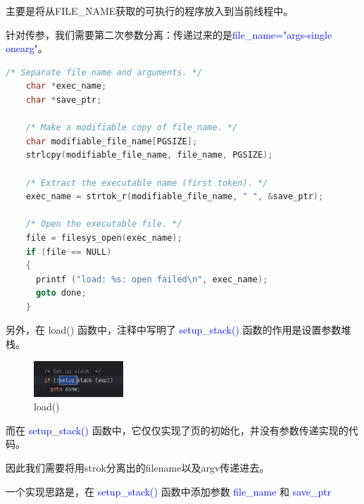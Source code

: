 \documentclass[14pt,a4paper,UTF8,twoside]{article}
\renewcommand{\texttt}[1]{\textcolor{blue}{\ttfamily #1}}
\begin{document}
主要是将从FILE\_NAME获取的可执行的程序放入到当前线程中。

针对传参，我们需要第二次参数分离：传递过来的是\texttt{file\_name="args-single onearg"}。

\begin{lstlisting}[language=C, title= load]
    /* Separate file name and arguments. */
    char *exec_name;
    char *save_ptr;
  
    /* Make a modifiable copy of file_name. */
    char modifiable_file_name[PGSIZE];
    strlcpy(modifiable_file_name, file_name, PGSIZE);
  
    /* Extract the executable name (first token). */
    exec_name = strtok_r(modifiable_file_name, " ", &save_ptr);
  
    /* Open the executable file. */
    file = filesys_open(exec_name);
    if (file == NULL) 
    {
      printf ("load: %s: open failed\n", exec_name);
      goto done; 
    }
\end{lstlisting}

另外，在 load() 函数中，注释中写明了 \texttt{setup\_stack()} 函数的作用是设置参数堆栈。

\begin{figure}[H]
    \centering
    \includegraphics[width=0.3\textwidth]{img5/setup.png}
    \caption{load()}
    \label{fig:load}
\end{figure}

而在 \texttt{setup\_stack()} 函数中，它仅仅实现了页的初始化，并没有参数传递实现的代码。

因此我们需要将用strok分离出的filename以及argv传递进去。

一个实现思路是，在 \texttt{setup\_stack()} 函数中添加参数 \texttt{file\_name} 和 \texttt{save\_ptr}
\end{document}
